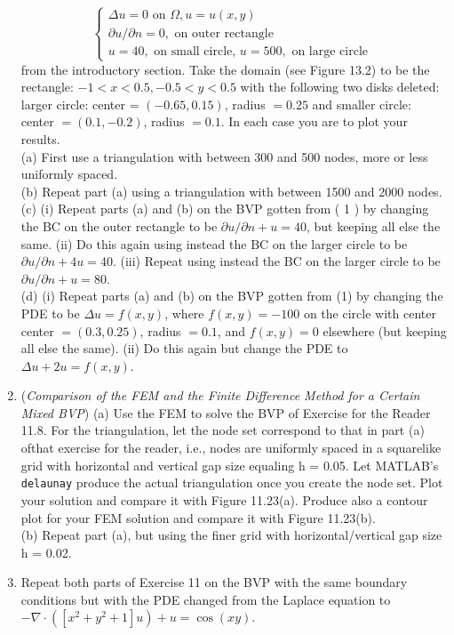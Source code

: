 \documentclass[../main.tex]{subfiles}
\begin{document}
\begin{enumerate}
	$$
\left\{\begin{array}{l}
\Delta u=0 \text { on } \Omega, u=u(x, y) \\
\partial u / \partial n=0, \text { on outer rectangle } \\
u=40, \text { on small circle, } u=500, \text { on large circle }
\end{array}\right.
$$
from the introductory section. Take the domain (see Figure 13.2) to be the rectangle: $-1<x<0.5,-0.5<y<0.5$ with the following two disks deleted: larger circle: center = $(-0.65,0.15)$, radius $=0.25$ and smaller circle: center $=(0.1,-0.2)$, radius $=0.1$. In each case you are to plot your results.\\
(a) First use a triangulation with between 300 and 500 nodes, more or less uniformly spaced.\\
(b) Repeat part (a) using a triangulation with between 1500 and 2000 nodes.\\
(c) (i) Repeat parts (a) and (b) on the BVP gotten from ( 1 ) by changing the BC on the outer rectangle to be $\partial u / \partial n+u=40$, but keeping all else the same. (ii) Do this again using instead the $\mathrm{BC}$ on the larger circle to be $\partial u / \partial n+4 u=40$. (iii) Repeat using instead the $\mathrm{BC}$ on the larger circle to be $\partial u / \partial n+u=80$.\\
(d) (i) Repeat parts (a) and (b) on the BVP gotten from (1) by changing the PDE to be $\Delta u=f(x, y)$, where $f(x, y)=-100$ on the circle with center center $=(0.3,0.25)$, radius $=0.1$, and $f(x, y)=0$ elsewhere (but keeping all else the same). (ii) Do this again but change the PDE to $\Delta u+2 u=f(x, y)$.
	\item (\textit{Comparison of the FEM and the Finite Difference Method for a Certain Mixed BVP}) (a) Use 
the FEM to solve the BVP of Exercise for the Reader 11.8. For the triangulation, let the node 
set correspond to that in part (a) ofthat exercise for the reader, i.e., nodes are uniformly spaced 
in a squarelike grid with horizontal and vertical gap size equaling h = 0.05. Let MATLAB's 
\texttt{delaunay} produce the actual triangulation once you create the node set. Plot your solution 
and compare it with Figure 11.23(a). Produce also a contour plot for your FEM solution and 
compare it with Figure 11.23(b).\\
(b) Repeat part (a), but using the finer grid with horizontal/vertical gap size h = 0.02. 
	\item Repeat both parts of Exercise 11 on the BVP with the same boundary conditions but with the PDE changed from the Laplace equation to $-\nabla \cdot\left(\left[x^{2}+y^{2}+1\right] u\right)+u=\cos (x y)$.

\end{enumerate}
\end{document}
